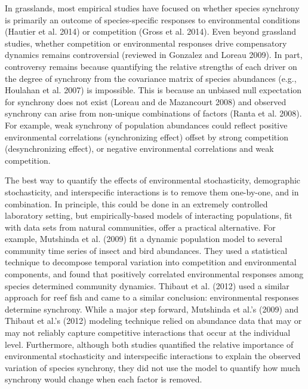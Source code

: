 \documentclass[12pt,]{article}
\begin{document}
In grasslands, most empirical studies have focused on whether species
synchrony is primarily an outcome of species-specific responses to
environmental conditions (Hautier et al. 2014) or competition (Gross et
al. 2014). Even beyond grassland studies, whether competition or
environmental responses drive compensatory dynamics remains
controversial (reviewed in Gonzalez and Loreau 2009). In part,
controversy remains because quantifying the relative strengths of each
driver on the degree of synchrony from the covariance matrix of species
abundances (e.g., Houlahan et al. 2007) is impossible. This is because
an unbiased null expectation for synchrony does not exist (Loreau and
{{de Mazancourt}} 2008) and observed synchrony can arise from non-unique
combinations of factors (Ranta et al. 2008). For example, weak synchrony
of population abundances could reflect positive environmental
correlations (synchronizing effect) offset by strong competition
(desynchronizing effect), or negative environmental correlations and
weak competition.

The best way to quantify the effects of environmental stochasticity,
demographic stochasticity, and interspecific interactions is to remove
them one-by-one, and in combination. In principle, this could be done in
an extremely controlled laboratory setting, but empirically-based models
of interacting populations, fit with data sets from natural communities,
offer a practical alternative. For example, Mutshinda et al. (2009) fit
a dynamic population model to several community time series of insect
and bird abundances. They used a statistical technique to decompose
temporal variation into competition and environmental components, and
found that positively correlated environmental responses among species
determined community dynamics. Thibaut et al. (2012) used a similar
approach for reef fish and came to a similar conclusion: environmental
responses determine synchrony. While a major step forward, Mutshinda et
al.'s (2009) and Thibaut et al.'s (2012) modeling technique relied on
abundance data that may or may not reliably capture competitive
interactions that occur at the individual level. Furthermore, although
both studies quantified the relative importance of environmental
stochasticity and interspecific interactions to explain the observed
variation of species synchrony, they did not use the model to quantify
how much synchrony would change when each factor is removed.
\end{document}
